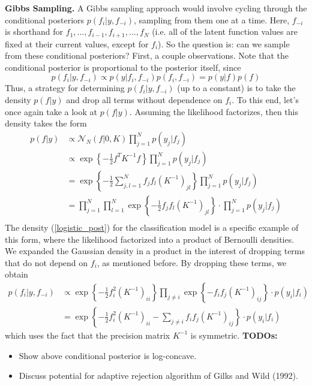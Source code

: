 \documentclass[12pt]{article}
\begin{document}
\bigskip
\noindent
\textbf{Gibbs Sampling.} A Gibbs sampling approach would involve cycling through the conditional posteriors $p(f_i|y, f_{-i})$, sampling from them one at a time. 
Here, $f_{-i}$ is shorthand for $f_1, \dots, f_{i - 1}, f_{i + 1}, \dots, f_N$ (i.e. all of the latent function values are fixed at their current values, except for $f_i$). So the question is:
can we sample from these conditional posteriors? First, a couple observations. Note that the conditional posterior is proportional to the posterior itself, since
\[p(f_i|y, f_{-i}) \propto p(y|f_i, f_{-i})p(f_i, f_{-i}) = p(y|f)p(f)\]
Thus, a strategy for determining $p(f_i|y, f_{-i})$ (up to a constant) is to take the density $p(f|y)$ and drop all terms without dependence on $f_i$. To this end, let's once again 
take a look at $p(f|y)$. Assuming the likelihood factorizes, then this density takes the form 
\begin{align*}
p(f|y) &\propto \mathcal{N}_N(f|0, K) \prod_{j = 1}^{N} p(y_j|f_j) \\
	 &\propto \exp\left\{-\frac{1}{2} f^T K^{-1} f \right\} \prod_{j = 1}^{N} p(y_j|f_j) \\
	 &= \exp\left\{-\frac{1}{2} \sum_{j,l = 1}^{N} f_j f_l \left(K^{-1}\right)_{jl} \right\} \prod_{j = 1}^{N} p(y_j|f_j) \\
	 &= \prod_{j = 1}^{N} \prod_{l = 1}^{N} \exp\left\{-\frac{1}{2} f_j f_l \left(K^{-1}\right)_{jl} \right\} \cdot \prod_{j = 1}^{N} p(y_j|f_j) \\
\end{align*}
The density (\ref{logistic_post}) for the classification model is a specific example of this form, where the likelihood factorized into a product of Bernoulli densities. We expanded 
the Gaussian density in a product in the interest of dropping terms that do not depend on $f_i$, as mentioned before. By dropping these terms, we obtain 
\begin{align*}
p(f_i|y, f_{-i}) &\propto \exp\left\{-\frac{1}{2}f_i^2 \left(K^{-1}\right)_{ii} \right\} \prod_{j \neq i} \exp\left\{-f_i f_j \left(K^{-1}\right)_{ij} \right\} \cdot p(y_i|f_i) \\
		    &= \exp\left\{-\frac{1}{2} f_i^2 \left(K^{-1}\right)_{ii} - \sum_{j \neq i} f_i f_j \left(K^{-1}\right)_{ij} \right\} \cdot p(y_i|f_i)
\end{align*}
which uses the fact that the precision matrix $K^{-1}$ is symmetric. 
\textbf{TODOs:}
\begin{itemize}
\item Show above conditional posterior is log-concave. 
\item Discuss potential for adaptive rejection algorithm of Gilks and Wild (1992). 
\end{itemize} 
\end{document}
